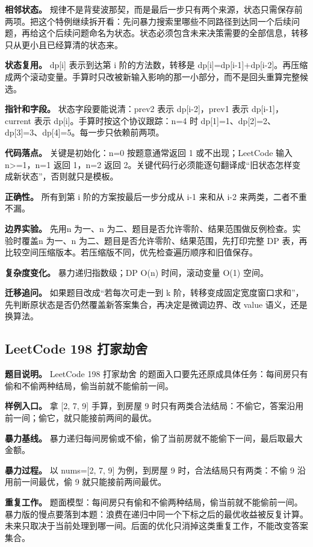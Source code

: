 \textbf{相邻状态。} 规律不是背斐波那契，而是最后一步只有两个来源，状态只需保存前两项。把这个特例继续拆开看：先问暴力搜索里哪些不同路径到达同一个后续问题，再给这个后续问题命名为状态。状态必须包含未来决策需要的全部信息，转移只从更小且已经算清的状态来。

\textbf{状态复用。} dp[i] 表示到达第 i 阶的方法数，转移是 dp[i]=dp[i-1]+dp[i-2]。再压缩成两个滚动变量。手算时只改被新输入影响的那一小部分，而不是回头重算完整候选。

\textbf{指针和字段。} 状态字段要能说清：prev2 表示 dp[i-2]，prev1 表示 dp[i-1]，current 表示 dp[i]。手算时按这个协议跟踪：n=4 时 dp[1]=1、dp[2]=2、dp[3]=3、dp[4]=5。每一步只依赖前两项。

\textbf{代码落点。} 关键是初始化：n=0 按题意通常返回 1 或不出现；LeetCode 输入 n>=1，n=1 返回 1，n=2 返回 2。关键代码行必须能逐句翻译成“旧状态怎样变成新状态”，否则就只是模板。

\textbf{正确性。} 所有到第 i 阶的方案按最后一步分成从 i-1 来和从 i-2 来两类，二者不重不漏。

\textbf{边界实验。} 先用n 为一、n 为二、题目是否允许零阶、结果范围做反例检查。实验时覆盖n 为一、n 为二、题目是否允许零阶、结果范围，先打印完整 DP 表，再比较空间压缩版本。若压缩版不同，优先检查遍历顺序和旧值保存。

\textbf{复杂度变化。} 暴力递归指数级；DP O(n) 时间，滚动变量 O(1) 空间。

\textbf{迁移追问。} 如果题目改成“若每次可走一到 k 阶，转移变成固定宽度窗口求和”，先判断原状态是否仍然覆盖新答案集合，再决定是微调边界、改 value 语义，还是换算法。

\subsection{LeetCode 198 打家劫舍}

\textbf{题目说明。} LeetCode 198 打家劫舍 的题面入口要先还原成具体任务：每间房只有偷和不偷两种结局，偷当前就不能偷前一间。

\textbf{样例入口。} 拿 [2, 7, 9] 手算，到房屋 9 时只有两类合法结局：不偷它，答案沿用前一间；偷它，就只能接前两间的最优。

\textbf{暴力基线。} 暴力递归每间房偷或不偷，偷了当前房就不能偷下一间，最后取最大金额。

\textbf{暴力过程。} 以 nums=[2, 7, 9] 为例，到房屋 9 时，合法结局只有两类：不偷 9 沿用前一间最优，偷 9 就只能接前两间最优。

\textbf{重复工作。} 题面模型：每间房只有偷和不偷两种结局，偷当前就不能偷前一间。暴力版的慢点要落到本题：浪费在递归中同一个下标之后的最优收益被反复计算。未来只取决于当前处理到哪一间。后面的优化只消掉这类重复工作，不能改变答案集合。


